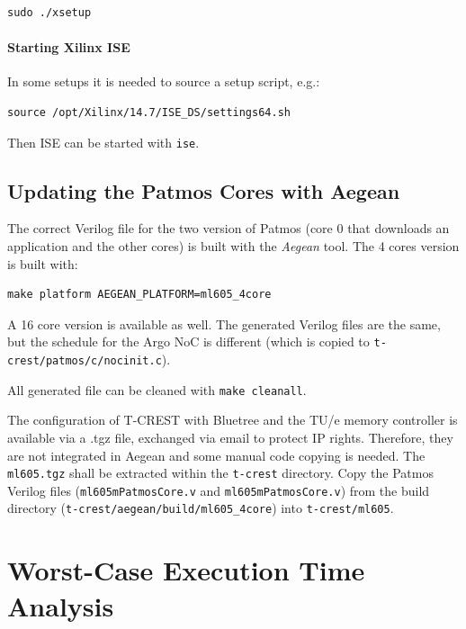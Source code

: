 \documentclass[a4paper,fontsize=10pt,twoside,DIV15,BCOR12mm,headinclude=true,footinclude=false,pagesize,bibtotoc]{scrbook}
\newcommand{\code}[1]{{\texttt{#1}}}
\begin{document}
\begin{verbatim}
sudo ./xsetup
\end{verbatim}

\paragraph{Starting Xilinx ISE}

In some setups it is needed to source a setup script, e.g.:

\begin{verbatim}
source /opt/Xilinx/14.7/ISE_DS/settings64.sh
\end{verbatim}

Then ISE can be started with \code{ise}.

\subsection{Updating the Patmos Cores with Aegean}

The correct Verilog file for the two version of Patmos (core 0 that downloads an application and the other cores)
is built with the \emph{Aegean} tool. The 4 cores version is built with:

\begin{verbatim}
make platform AEGEAN_PLATFORM=ml605_4core
\end{verbatim}


A 16 core version is available as well. The generated Verilog files are the same,
but the schedule for the Argo NoC is different (which is copied to
\code{t-crest/patmos/c/nocinit.c}).

All generated file can be cleaned with \code{make cleanall}.

The configuration of T-CREST with Bluetree and the TU/e memory controller
is available via a .tgz file, exchanged via email to protect IP rights.
Therefore, they are not integrated in Aegean and some manual code copying is needed.
The \code{ml605.tgz} shall be extracted within the \code{t-crest} directory.
Copy the Patmos Verilog files (\code{ml605mPatmosCore.v} and \code{ml605mPatmosCore.v})
from the build directory (\code{t-crest/aegean/build/ml605\_4core}) into \code{t-crest/ml605}.


\section{Worst-Case Execution Time Analysis}
\end{document}
